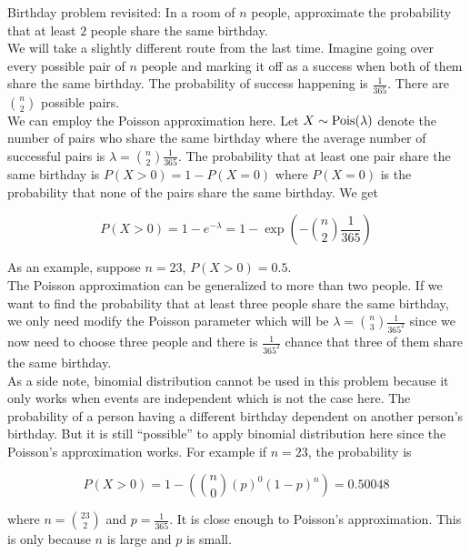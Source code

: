 \begin{texample}
	Birthday problem revisited: In a room of $n$ people, approximate the probability that at least $2$ people share the same birthday. \\
	
	We will take a slightly different route from the last time. Imagine going over every possible pair of $n$ people and marking it off as a success when both of them share the same birthday. The probability of success happening is $\frac{1}{365}$. There are ${n \choose 2}$ possible pairs. \\
	
	We can employ the Poisson approximation here. Let $X\sim\operatorname{Pois}(\lambda)$ denote the number of pairs who share the same birthday where the average number of successful pairs is $\lambda={n \choose 2}\frac{1}{365}$. The probability that at least one pair share the same birthday is $P(X>0)=1-P(X=0)$ where $P(X=0)$ is the probability that none of the pairs share the same birthday. We get
	
	$$P(X>0)=1-e^{-\lambda}=1-\exp\left( -{n \choose 2}\frac{1}{365} \right)$$
	
	As an example, suppose $n=23$, $P(X>0)=0.5$. \\
	
	The Poisson approximation can be generalized to more than two people. If we want to find the probability that at least three people share the same birthday, we only need modify the Poisson parameter which will be $\lambda={n \choose 3}\frac{1}{365^2}$ since we now need to choose three people and there is $\frac{1}{365^2}$ chance that three of them share the same birthday. \\
	
	As a side note, binomial distribution cannot be used in this problem because it only works when events are independent which is not the case here. The probability of a person having a different birthday dependent on another person's birthday. But it is still ``possible'' to apply binomial distribution here since the Poisson's approximation works. For example if $n=23$, the probability is
	
	$$P(X>0)=1-\left({n \choose 0} \left( p \right)^0 \left( 1-p \right)^{n}\right)=0.50048$$
	
	where $n={23 \choose 2}$ and $p=\frac{1}{365}$. It is close enough to Poisson's approximation. This is only because $n$ is large and $p$ is small.
\end{texample}

